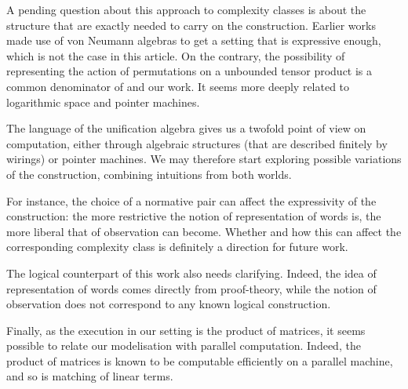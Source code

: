 A pending question about this approach to complexity classes is about the structure that are exactly needed to carry on the construction. 
Earlier works made use of von Neumann algebras to get a setting that is expressive enough, which is not the case in this article.
On the contrary, the possibility of representing the action of permutations on a unbounded tensor product is a common denominator of
\cite{girard_normativity_2012,aubert_characterizing_2012,seiller_logarithmic_2013} and our work.
It seems more deeply related to logarithmic space and pointer machines.

\smallskip
The language of the unification algebra gives us a twofold point of view on computation, either through algebraic structures (that are described finitely by wirings) or pointer machines.
We may therefore start exploring possible variations of the construction, combining intuitions from both worlds.

\smallskip
For instance, the choice of a normative pair can affect the expressivity of the construction:
the more restrictive the notion of representation of words is, the more liberal that of observation can become.
Whether and how this can affect the corresponding complexity class is definitely a direction for future work.

\smallskip
The logical counterpart of this work also needs clarifying.
Indeed, the idea of representation of words comes directly from proof-theory, while the notion of observation does not correspond to any known logical construction.

\smallskip
Finally, as the execution in our setting is the product of matrices, it seems possible to relate our modelisation with parallel computation. Indeed, the product of matrices is known to be computable efficiently on a parallel machine, and so is matching of linear terms.

